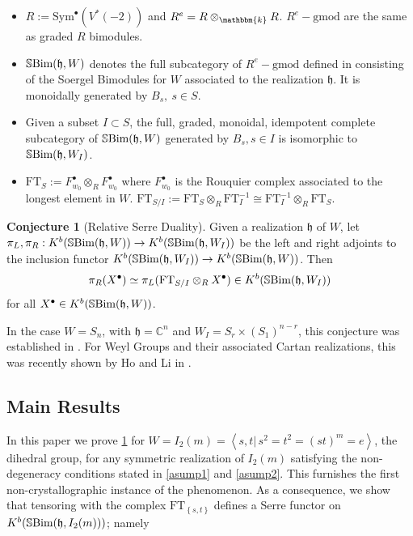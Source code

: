 \documentclass[10pt]{article}
\numberwithin{theorem}{section}
\theoremstyle{definition}
\newtheorem{conjecture}{Conjecture}
\newcommand{\kb}{\mathbbm{k}}
\newcommand{\hf}{\mathfrak{h}}
\newcommand{\Cb}{\mathbb{C}}
\newcommand{\sbim}{\mathbb{S}\textnormal{Bim}}
\newcommand{\abrac}[1]{\left\langle#1\right\rangle}
\newcommand{\set}[1]{\left \{ #1 \right \}}
\newcommand{\ft}{\mathrm{FT}}
\newcommand{\0}{\ \raisebox{-2ex}{\begin{tikzpicture}[xscale=0.25,yscale=0.3,thick,baseline]
 \draw (0,0) -- (0,3); 
\end{tikzpicture}}}
\renewcommand{\1}{\ \raisebox{-2ex}{\begin{tikzpicture}[xscale=0.25,yscale=0.3,thick,baseline]
 \draw (0,0) -- (0,1);
 \draw (0,2) -- (0,3);
 \node[dot] at (0,1) {};
  \node[dot] at (0,2) {};
\end{tikzpicture}}}
\begin{document}
\begin{itemize}
    \item $R:=\mathrm{Sym}^\bullet (V^*(-2))$ and $R^e=R\otimes_\kb R$. $R^e-\mathrm{gmod}$ are the same as graded $R$ bimodules. 
    \item $\sbim(\hf, W)$ denotes the full subcategory of $R^e-\mathrm{gmod}$ defined in \cite[Section 3.4]{SC} consisting of the Soergel Bimodules for $W$ associated to the realization $\hf$. It is monoidally generated by $B_s, \ s\in S$. 
    \item Given a subset $I\subset S$, the full, graded, monoidal, idempotent complete subcategory of $\sbim(\hf, W)$ generated by $B_s, s\in I$ is isomorphic to $\sbim(\hf, W_I)$.
    \item $\ft_S:=F^\bullet_{w_0}\otimes_R F^\bullet_{w_0} $ where $F^\bullet_{w_0}$ is the Rouquier complex associated to the longest element in $W$. $\ft_{S/I}:=\ft_{S}\otimes_R\ft_{I}^{-1}\cong \ft_{I}^{-1}\otimes_R\ft_{S}$.
\end{itemize}

\begin{conjecture}[Relative Serre Duality]
\label{ghmnconj}
   Given a realization $\hf$ of $W$, let $\pi_L, \pi_R:K^b(\sbim(\hf, W))\to  K^b(\sbim(\hf, W_I))$ be the left and right adjoints to the inclusion functor $K^b(\sbim(\hf, W_I))\to K^b(\sbim(\hf, W))$. Then 
    $$\pi_R(X^\bullet)\simeq \pi_L( \ft_{S/I}\otimes_R X^\bullet )\in K^b(\sbim(\hf,W_I))$$
    for all $X^\bullet\in K^b(\sbim(\hf,W))$. 
\end{conjecture}

In the case $W=S_n$, with $\hf=\Cb^n$ and $W_I=S_{r}\times (S_1)^{n-r}$, this conjecture was established in \cite{GHMN19}. For Weyl Groups and their associated Cartan realizations, this was recently shown by Ho and Li in \cite{HL25}.



\subsection{Main Results}

In this paper we prove \cref{ghmnconj} for $W=I_2(m)=\abrac{s,t|\, s^2=t^2=(st)^m=e}$, the dihedral group, for any symmetric realization of $I_2(m)$ satisfying the non-degeneracy conditions stated in \cref{asump1} and \cref{asump2}. This furnishes the first non-crystallographic instance of the phenomenon. As a consequence, we show that tensoring with the complex $\ft_{\set{s,t}}$ defines a Serre functor on $K^b(\sbim(\hf, I_2(m)))$; namely
\end{document}
